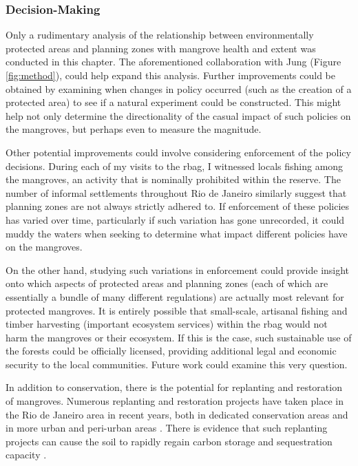 \newpage

\subsubsection{Decision-Making}

Only a rudimentary analysis of the relationship between environmentally protected areas and planning zones with mangrove health and extent was conducted in this chapter. The aforementioned collaboration with Jung (Figure \ref{fig:method}), could help expand this analysis. Further improvements could be obtained by examining when changes in policy occurred (such as the creation of a protected area) to see if a natural experiment could be constructed. This might help not only determine the directionality of the casual impact of such policies on the mangroves, but perhaps even to measure the magnitude. 

Other potential improvements could involve considering enforcement of the policy decisions. During each of my visits to the \ac{rbag}, I witnessed locals fishing among the mangroves, an activity that is nominally prohibited within the reserve. The number of informal settlements throughout Rio de Janeiro similarly suggest that planning zones are not always strictly adhered to. If enforcement of these policies has varied over time, particularly if such variation has gone unrecorded, it could muddy the waters when seeking to determine what impact different policies have on the mangroves.

On the other hand, studying such variations in enforcement could provide insight onto which aspects of protected areas and planning zones (each of which are essentially a bundle of many different regulations) are actually most relevant for protected mangroves. It is entirely possible that small-scale, artisanal fishing and timber harvesting (important ecosystem services) within the \ac{rbag} would not harm the mangroves or their ecosystem. If this is the case, such sustainable use of the forests could be officially licensed, providing additional legal and economic security to the local communities. Future work could examine this very question.

In addition to conservation, there is the potential for replanting and restoration of mangroves. Numerous replanting and restoration projects have taken place in the Rio de Janeiro area in recent years, both in dedicated conservation areas \cite{granadoAssessingGeneticDiversity2018} and in more urban and peri-urban areas \cite{rioprefeituraEnvironmentalRecoveryRodrigo2019, soaresEstruturaVegetalGrau1999}. There is evidence that such replanting projects can cause the soil to rapidly regain carbon storage and sequestration capacity \cite{jimenezRecoverySoilProcesses2022}.

